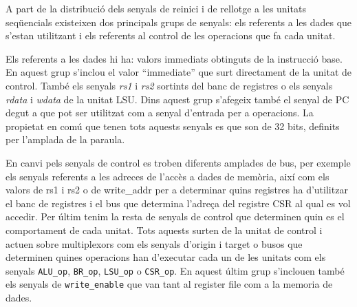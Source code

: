 \documentclass[10pt,a4paper,twocolumn,twoside]{article}
\begin{document}
        A part de la distribució dels senyals de reinici i de rellotge a les unitats seqüencials existeixen dos principals grups de senyals: els referents a les dades que s'estan utilitzant i els referents al control de les operacions que fa cada unitat.
        
        Els referents a les dades hi ha: valors immediats obtinguts de la instrucció base. En aquest grup s'inclou el valor ``immediate'' que surt directament de la unitat de control. %
        També els senyals \textit{rs1} i \textit{rs2} sortints del banc de registres o els senyals \textit{rdata} i \textit{wdata} de la unitat LSU. Dins aquest grup s'afegeix també el senyal de PC degut a que pot ser utilitzat com a senyal d'entrada per a operacions. La propietat en comú que tenen tots aquests senyals es que son de 32 bits, definits per l'amplada de la paraula.
        
        En canvi pels senyals de control es troben diferents amplades de bus, per exemple els senyals referents a les adreces de l'accès a dades de memòria, així com els valors de rs1 i rs2 o de write\_addr per a determinar quins registres ha d'utilitzar el banc de registres i el bus que determina l'adreça del registre CSR al qual es vol accedir. Per últim tenim la resta de senyals de control que determinen quin es el comportament de cada unitat. Tots aquests surten de la unitat de control i actuen sobre multiplexors com els senyals d'origin i target o busos que determinen quines operacions han d'executar cada un de les unitats com els senyals \verb|ALU_op|, \verb|BR_op|, \verb|LSU_op| o \verb|CSR_op|. En aquest últim grup s'inclouen també els senyals de \verb|write_enable| que van tant al register file com a la memoria de dades.
        
        
        
        

        
        
        
        
        
\end{document}
